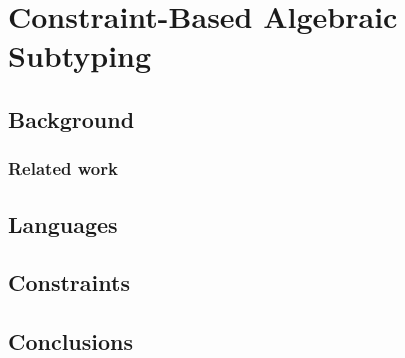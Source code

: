 \chapter{Constraint-Based Algebraic Subtyping}
\label{algebraic-subtyping}

\section{Background}

\subsection{Related work}

\section{Languages}

\section{Constraints}

\section{Conclusions}
